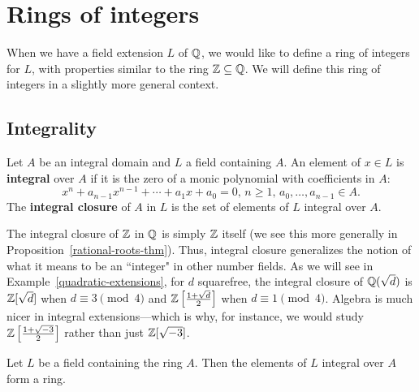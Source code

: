 \chapter{Rings of integers}
When we have a field extension $L$ of $\mathbb{Q}$, we would like to define a ring of integers for $L$, with properties similar to the ring $\mathbb{Z}\subseteq \mathbb{Q}$. We will define this ring of integers in a slightly more general context.
\section{Integrality}
\begin{df}
Let $A$ be an integral domain and $L$ a field containing $A$. An element of $x\in L$ is \textbf{integral} over $A$ if it is the zero of a monic polynomial with coefficients in $A$:
\[
x^n+a_{n-1}x^{n-1}+\cdots +a_1x+a_0=0,\, n\ge 1,\, a_0,\ldots, a_{n-1}\in A.
\]
The \textbf{integral closure} of $A$ in $L$ is the set of elements of $L$ integral over $A$.
\end{df}
\begin{ex}
The integral closure of $\mathbb{Z}$ in $\mathbb{Q}$ is simply $\mathbb{Z}$ itself (we see this more generally in Proposition~\ref{rational-roots-thm}). Thus, integral closure generalizes the notion of what it means to be an ``integer" in other number fields. As we will see in Example~\ref{quadratic-extensions}, for $d$ squarefree, the integral closure of $\mathbb{Q}(\sqrt{d})$ is $\mathbb{Z}[\sqrt{d}]$ when $d\equiv 3\pmod 4$ and $\mathbb{Z}\left[ {\frac{1+\sqrt{d}}{2}} \right]$ when $d\equiv 1\pmod 4$. Algebra is much nicer in integral extensions---which is why, for instance, we would study $\mathbb{Z}\left[ {\frac{1+\sqrt{-3}}{2}} \right]$ rather than just $\mathbb{Z}[\sqrt{-3}]$.
\end{ex}
\begin{thm}
Let $L$ be a field containing the ring $A$. Then
the elements of $L$ integral over $A$ form a ring.
\end{thm}
